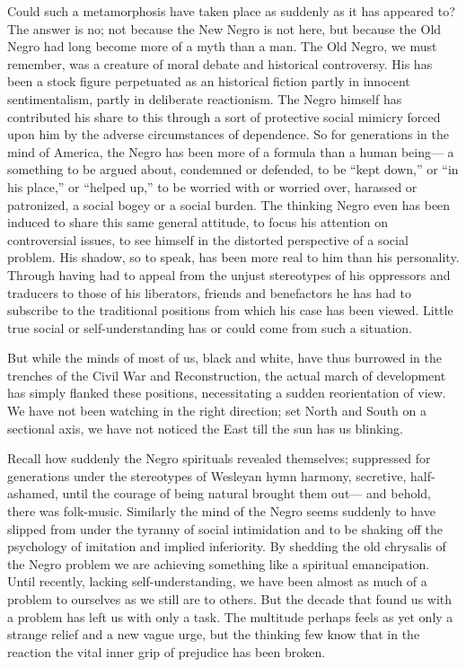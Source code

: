 \documentclass[12pt]{article}
\begin{document}
Could such a metamorphosis have taken place as suddenly as it has appeared to? The answer is no; not because the New Negro is not here, but because the Old Negro had long become more of a myth than a man. The Old Negro, we must remember, was a creature of moral debate and historical controversy. His has been a stock figure perpetuated as an historical fiction partly in innocent sentimentalism, partly in deliberate reactionism. The Negro himself has contributed his share to this through a sort of protective social mimicry forced upon him by the adverse circumstances of dependence. So for generations in the mind of America, the Negro has been more of a formula than a human being--- a something to be argued about, condemned or defended, to be ``kept down,'' or ``in his place,'' or ``helped up,'' to be worried with or worried over, harassed or patronized, a social bogey or a social burden. The thinking Negro even has been induced to share this same general attitude, to focus his attention on controversial issues, to see himself in the distorted perspective of a social problem. His shadow, so to speak, has been more real to him than his personality. Through having had to appeal from the unjust stereotypes of his oppressors and traducers to those of his liberators, friends and benefactors he has had to subscribe to the traditional positions from which his case has been viewed. Little true social or self-understanding has or could come from such a situation.

But while the minds of most of us, black and white, have thus burrowed in the trenches of the Civil War and Reconstruction, the actual march of development has simply flanked these positions, necessitating a sudden reorientation of view. We have not been watching in the right direction; set North and South on a sectional axis, we have not noticed the East till the sun has us blinking.

Recall how suddenly the Negro spirituals revealed themselves; suppressed for generations under the stereotypes of Wesleyan hymn harmony, secretive, half-ashamed, until the courage of being natural brought them out--- and behold, there was folk-music. Similarly the mind of the Negro seems suddenly to have slipped from under the tyranny of social intimidation and to be shaking off the psychology of imitation and implied inferiority. By shedding the old chrysalis of the Negro problem we are achieving something like a spiritual emancipation. Until recently, lacking self-understanding, we have been almost as much of a problem to ourselves as we still are to others. But the decade that found us with a problem has left us with only a task. The multitude perhaps feels as yet only a strange relief and a new vague urge, but the thinking few know that in the reaction the vital inner grip of prejudice has been broken.
\end{document}

